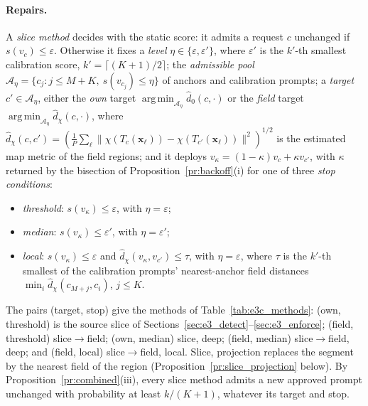 \documentclass{article}
\DeclareMathOperator*{\argmin}{arg\,min}
\newcommand{\bx}{\mathbf{x}}
\theoremstyle{plain}
\theoremstyle{remark}
\begin{document}
\paragraph{Repairs.}
A \emph{slice method} decides with the static score: it admits a request $c$ unchanged if $s(v_c)\le\varepsilon$. Otherwise it fixes a
\emph{level} $\eta\in\{\varepsilon,\varepsilon'\}$, where $\varepsilon'$ is the $k'$-th smallest calibration score,
$k'=\lceil(K+1)/2\rceil$; the \emph{admissible pool} $\mathcal A_\eta=\{c_j:j\le M+K,\ s(v_{c_j})\le\eta\}$ of anchors and calibration
prompts; a \emph{target} $c'\in\mathcal A_\eta$, either the \emph{own} target $\argmin_{\mathcal A_\eta}\hat d_0(c,\cdot)$ or the
\emph{field} target $\argmin_{\mathcal A_\eta}\hat d_\chi(c,\cdot)$, where
$\hat d_\chi(c,c')=(\frac1P\sum_\ell\|\chi(T_c(\bx_\ell))-\chi(T_{c'}(\bx_\ell))\|^2)^{1/2}$ is the estimated map metric of the field
regions; and it deploys $v_\kappa=(1-\kappa)v_c+\kappa v_{c'}$, with $\kappa$ returned by the bisection of
Proposition~\ref{pr:backoff}(i) for one of three \emph{stop conditions}:
\begin{itemize}
\item \emph{threshold}: $s(v_\kappa)\le\varepsilon$, with $\eta=\varepsilon$;
\item \emph{median}: $s(v_\kappa)\le\varepsilon'$, with $\eta=\varepsilon'$;
\item \emph{local}: $s(v_\kappa)\le\varepsilon$ and $\hat d_\chi(v_\kappa,v_{c'})\le\tau$, with $\eta=\varepsilon$, where $\tau$ is the
$k'$-th smallest of the calibration prompts' nearest-anchor field distances $\min_i\hat d_\chi(c_{M+j},c_i)$, $j\le K$.
\end{itemize}
The pairs (target, stop) give the methods of Table~\ref{tab:e3c_methods}: (own, threshold) is the source slice of
Sections~\ref{sec:e3_detect}--\ref{sec:e3_enforce}; (field, threshold) slice$\to$field; (own, median) slice, deep; (field, median)
slice$\to$field, deep; and (field, local) slice$\to$field, local. Slice, projection replaces the segment by the nearest field of the
region (Proposition~\ref{pr:slice_projection} below). By Proposition~\ref{pr:combined}(iii), every slice method admits a new approved
prompt unchanged with probability at least $k/(K+1)$, whatever its target and stop.
\end{document}

